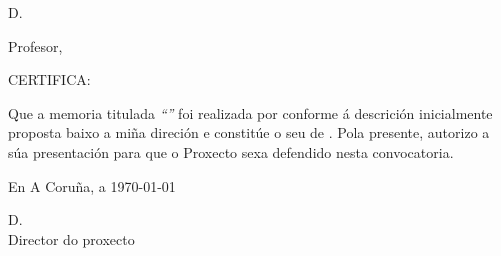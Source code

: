 %
%
\thispagestyle{plain}
\begin{center}
	\begin{minipage}[t][6cm][l]{.8\textwidth}
		\begin{center}
			D. {\sc \director}

			Profesor, \centro

			\departamento
			
			\universidad
		\end{center}
	\end{minipage}
\end{center}

CERTIFICA:

Que a memoria titulada {\it ``\titulogalego''} foi realizada por {\sc \autor}
conforme á descrición inicialmente proposta baixo a miña direción e
constitúe o seu {\proyecto} de {\curso}.
Pola presente, autorizo a súa presentación para que o Proxecto sexa defendido
nesta convocatoria.

\vspace{3cm}

En A Coruña, a \today

\vspace{3cm}
\begin{center}
	\begin{minipage}[t][4cm][l]{.5\textwidth}
	D. {\sc \director}
	\\
	Director do proxecto
	\end{minipage}
\end{center}
